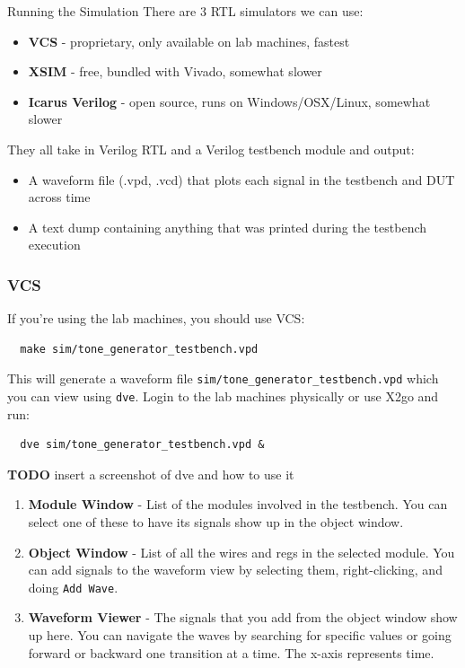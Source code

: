 \documentclass[11pt]{article}
\makeatletter
\renewcommand{\subsection}
{\@startsection {subsection}{1}{0pt}
 {-1ex}
 {0.5ex}
 {\bfseries\normalsize}}
\makeatother
\begin{document}
\subsection{Running the Simulation}
There are 3 RTL simulators we can use:
\begin{itemize}
  \item \textbf{VCS} - proprietary, only available on lab machines, fastest
  \item \textbf{XSIM} - free, bundled with Vivado, somewhat slower
  \item \textbf{Icarus Verilog} - open source, runs on Windows/OSX/Linux, somewhat slower
\end{itemize}
They all take in Verilog RTL and a Verilog testbench module and output:
\begin{itemize}
  \item A waveform file (.vpd, .vcd) that plots each signal in the testbench and DUT across time
  \item A text dump containing anything that was printed during the testbench execution
\end{itemize}

\subsubsection{VCS}
If you're using the lab machines, you should use VCS:
\begin{verbatim}
  make sim/tone_generator_testbench.vpd
\end{verbatim}
This will generate a waveform file \verb|sim/tone_generator_testbench.vpd| which you can view using \verb|dve|.
Login to the lab machines physically or use X2go and run:
\begin{verbatim}
  dve sim/tone_generator_testbench.vpd &
\end{verbatim}

\textbf{TODO} insert a screenshot of dve and how to use it
\begin{enumerate}
	\item \textbf{Module Window} - List of the modules involved in the testbench. You can select one of these to have its signals show up in the object window.
	\item \textbf{Object Window} - List of all the wires and regs in the selected module. You can add signals to the waveform view by selecting them, right-clicking, and doing \verb|Add Wave|.
	\item \textbf{Waveform Viewer} - The signals that you add from the object window show up here. You can navigate the waves by searching for specific values or going forward or backward one transition at a time. The x-axis represents time.
\end{enumerate}
\end{document}
